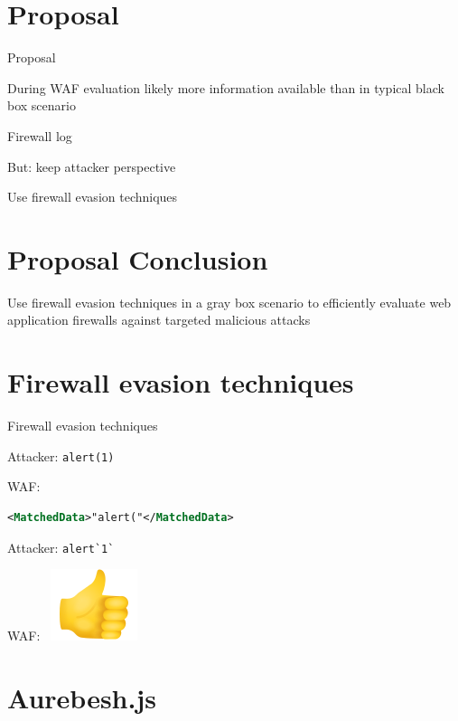 \documentclass[aspectratio=169]{beamer}
\newcommand{\supertext}[1]{\fontsize{30}{40}\selectfont #1}
\begin{document}
\section{Proposal}
\begin{frame}[fragile]{Proposal}
	\begin{vfilleditems}
		\item<2-> During WAF evaluation likely more information available than in typical black box scenario
		\item<3-> Firewall log
		\item<4-> But: keep attacker perspective
		\item<5-> Use firewall evasion techniques
	\end{vfilleditems}
\end{frame}

\section*{Proposal Conclusion}
\begin{frame}
	\centering
	\vfill
	\supertext{Use firewall evasion techniques in a gray box scenario to efficiently evaluate web application firewalls against targeted malicious attacks}
	\vfill
\end{frame}

\section{Firewall evasion techniques}
\begin{frame}[fragile]{Firewall evasion techniques}
	\begin{vfilleditems}
		\item<2-> Attacker: \verb|alert(1)|
		\item<3-> WAF:
		\begin{lstlisting}[style=ruleStyle, language=XML]
<MatchedData>"alert("</MatchedData>
\end{lstlisting}
		\item<4-> Attacker: \verb|alert`1`|
		\item<5-> WAF: \  \includegraphics[width=.07\linewidth]{thumbsup.png}
	\end{vfilleditems}
\end{frame}

\section{Aurebesh.js}
\end{document}
